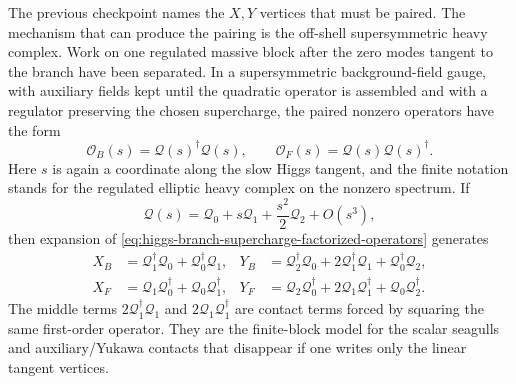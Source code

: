 \begin{example}
\label{ex:higgs-branch-supercharge-factorization}
The previous checkpoint names the \(X,Y\) vertices that must be paired.  The
mechanism that can produce the pairing is the off-shell supersymmetric heavy
complex.  Work on one regulated massive block after the zero modes tangent to
the branch have been separated.  In a supersymmetric background-field gauge,
with auxiliary fields kept until the quadratic operator is assembled and with a
regulator preserving the chosen supercharge, the paired nonzero operators have
the form
\begin{equation}
  {\mathcal O}_B(s)
  =
  {\mathcal Q}(s)^\dagger{\mathcal Q}(s),
  \qquad
  {\mathcal O}_F(s)
  =
  {\mathcal Q}(s){\mathcal Q}(s)^\dagger .
  \label{eq:higgs-branch-supercharge-factorized-operators}
\end{equation}
Here \(s\) is again a coordinate along the slow Higgs tangent, and the finite
notation stands for the regulated elliptic heavy complex on the nonzero
spectrum.  If
\[
  {\mathcal Q}(s)
  =
  {\mathcal Q}_0+s{\mathcal Q}_1+\frac{s^2}{2}{\mathcal Q}_2+O(s^3),
\]
then expansion of \eqref{eq:higgs-branch-supercharge-factorized-operators}
generates
\begin{equation}
\begin{aligned}
  X_B
  &=
  {\mathcal Q}_1^\dagger{\mathcal Q}_0
  +
  {\mathcal Q}_0^\dagger{\mathcal Q}_1,
  &
  Y_B
  &=
  {\mathcal Q}_2^\dagger{\mathcal Q}_0
  +
  2{\mathcal Q}_1^\dagger{\mathcal Q}_1
  +
  {\mathcal Q}_0^\dagger{\mathcal Q}_2,\\
  X_F
  &=
  {\mathcal Q}_1{\mathcal Q}_0^\dagger
  +
  {\mathcal Q}_0{\mathcal Q}_1^\dagger,
  &
  Y_F
  &=
  {\mathcal Q}_2{\mathcal Q}_0^\dagger
  +
  2{\mathcal Q}_1{\mathcal Q}_1^\dagger
  +
  {\mathcal Q}_0{\mathcal Q}_2^\dagger .
  \label{eq:higgs-branch-supercharge-factorized-vertices}
\end{aligned}
\end{equation}
The middle terms \(2{\mathcal Q}_1^\dagger{\mathcal Q}_1\) and
\(2{\mathcal Q}_1{\mathcal Q}_1^\dagger\) are contact terms forced by squaring
the same first-order operator.  They are the finite-block model for the scalar
seagulls and auxiliary/Yukawa contacts that disappear if one writes only the
linear tangent vertices.


\end{example}
